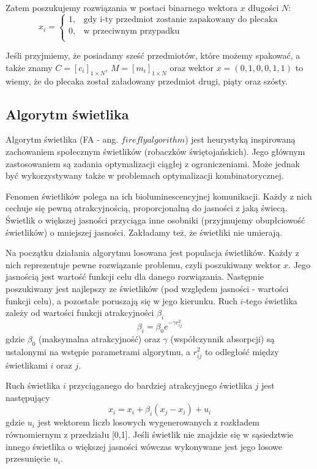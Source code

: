 \documentclass[11pt,a4paper,twoside]{article}
\begin{document}
Zatem poszukujemy rozwiązania w postaci binarnego wektora $x$ długości $N$:
$$x_{i} = 
	\begin{cases} 
      1, & \text{gdy i-ty przedmiot zostanie zapakowany do plecaka} \\
      0, & \text{w przeciwnym przypadku}\\
   \end{cases}
$$

Jeśli przyjmiemy, że posiadamy sześć przedmiotów, które możemy spakować, a także znamy $C = [c_{i}]_{1\times N}$, $M = [m_{i}]_{1\times N}$ oraz wektor $x = (0, 1, 0, 0, 1, 1)$ to wiemy, że do plecaka został załadowany przedmiot drugi, piąty oraz szósty. 

\subsection{Algorytm świetlika}
Algorytm świetlika (FA - ang. $firefly algorithm$) jest heurystyką inspirowaną zachowaniem społecznym świetlików (robaczków świętojańskich). Jego głównym zastosowaniem są zadania optymalizacji ciągłej z ograniczeniami. Może jednak być wykorzystywany także w problemach optymalizacji kombinatorycznej.

Fenomen świetlików polega na ich bioluminescencyjnej komunikacji. Każdy z nich cechuje się pewną atrakcyjnością, proporcjonalną do jasności z jaką świecą. Świetlik o większej jasności przyciąga inne osobniki (przyjmujemy obupłciowość świetlików) o mniejszej jasności. Zakładamy też, że świetliki nie umierają.

Na początku działania algorytmu losowana jest populacja świetlików. Każdy z nich reprezentuje pewne rozwiązanie problemu, czyli poszukiwany wektor $x$. Jego jasnością jest wartość funkcji celu dla danego rozwiązania. Następnie poszukiwany jest najlepszy ze świetlików (pod względem jasności - wartości funkcji celu), a pozostałe poruszają się w jego kierunku. Ruch $i$-tego świetlika zależy od wartości funkcji atrakcyjności $\beta_{i}$
\begin{equation}
\beta_{i} = \beta_{0} e^{-\gamma r_{ij}^{2}}
\end{equation}
gdzie $\beta_{0}$ (maksymalna atrakcyjność) oraz $\gamma$ (współczynnik absorpcji) są ustalonymi na wstępie parametrami algorytmu, a $r_{ij}^{2}$ to odległość między świetlikami $i$ oraz $j$.

Ruch świetlika $i$ przyciąganego do bardziej atrakcyjnego świetlika $j$ jest następujący
\begin{equation}
x_{i} = x_{i} + \beta_{i}(x_{j} - x_{i}) + u_{i} 
\label{moveFA}
\end{equation}
gdzie $u_{i}$ jest wektorem liczb losowych wygenerowanych z rozkładem równomiernym z przedziału [0,1]. Jeśli świetlik nie znajdzie się w sąsiedztwie innego świetlika o większej jasności wówczas wykonywane jest jego losowe przesunięcie $u_{i}$.
\end{document}
